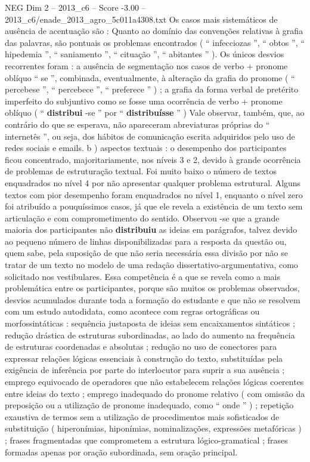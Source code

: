 \begin{textsample}{NEG Dim 2 – 2013\_c6 – Score -3.00 – 2013\_c6/enade\_2013\_agro\_5c011a4308.txt}
Os casos mais sistemáticos de ausência de acentuação são : Quanto ao domínio das convenções relativas à grafia das palavras, são pontuais os problemas encontrados ( “ infecciozas ”, “ obtos ”, “ hipedemia ”, “ saniamento ”, “ cituação ”, “ abitantes ” ).
Os únicos desvios recorrentes foram : a ausência de segmentação nos casos de verbo + pronome oblíquo “ se ”, combinada, eventualmente, à alteração da grafia do pronome ( “ percebese ”, “ percebece ”, “ preferece ” ) ; a grafia da forma verbal de pretérito imperfeito do subjuntivo como se fosse uma ocorrência de verbo + pronome oblíquo ( “ \textbf{distribui} -se ” por “ \textbf{distribuísse} ” ) Vale observar, também, que, ao contrário do que se esperava, não apareceram abreviaturas próprias do “ internetês ”, ou seja, dos hábitos de comunicação escrita adquiridos pelo uso de redes sociais e emails. b ) aspectos textuais : o desempenho dos participantes ficou concentrado, majoritariamente, nos níveis 3 e 2, devido à grande ocorrência de problemas de estruturação textual.
Foi muito baixo o número de textos enquadrados no nível 4 por não apresentar qualquer problema estrutural.
Alguns textos com pior desempenho foram enquadrados no nível 1, enquanto o nível zero foi atribuído a pouquíssimos casos, já que ele revela a existência de um texto sem articulação e com comprometimento do sentido.
Observou -se que a grande maioria dos participantes não \textbf{distribuiu} as ideias em parágrafos, talvez devido ao pequeno número de linhas disponibilizadas para a resposta da questão ou, quem sabe, pela suposição de que não seria necessária essa divisão por não se tratar de um texto no modelo de uma redação dissertativo-argumentativa, como solicitado nos vestibulares.
Essa competência é a que se revela como a mais problemática entre os participantes, porque são muitos os problemas observados, desvios acumulados durante toda a formação do estudante e que não se resolvem com um estudo autodidata, como acontece com regras ortográficas ou morfossintáticas : sequência justaposta de ideias sem encaixamentos sintáticos ; redução drástica de estruturas subordinadas, ao lado do aumento na frequência de estruturas coordenadas e absolutas ; redução no uso de conectores para expressar relações lógicas essenciais à construção do texto, substituídas pela exigência de inferência por parte do interlocutor para suprir a sua ausência ; emprego equivocado de operadores que não estabelecem relações lógicas coerentes entre ideias do texto ; emprego inadequado do pronome relativo ( com omissão da preposição ou a utilização de pronome inadequado, como “ onde ” ) ; repetição exaustiva de termos sem a utilização de procedimentos mais sofisticados de substituição ( hiperonímias, hiponímias, nominalizações, expressões metafóricas ) ; frases fragmentadas que comprometem a estrutura lógico-gramatical ; frases formadas apenas por oração subordinada, sem oração principal.

\end{textsample}
